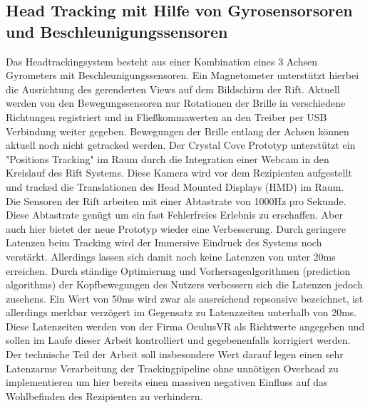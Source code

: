 \documentclass[pagesize, paper=a4, fontsize=12pt,titlepage=true, headings=small, headnosepline, abstractoff, liststotoc, nochapterprefix, plainheadsepline]{scrreprt}
\begin{document}
\subsection{Head Tracking mit Hilfe von Gyrosensorsoren  und Beschleunigungssensoren}
Das Headtrackingsystem besteht aus einer Kombination eines 3 Achsen Gyrometers mit Beschleunigungssensoren. Ein Magnetometer unterstützt hierbei die Ausrichtung des gerenderten Views auf dem Bildschirm der Rift. Aktuell werden von den Bewegungssensoren nur Rotationen der Brille in verschiedene Richtungen registriert und in Fließkommawerten an den Treiber per USB Verbindung weiter gegeben. Bewegungen der Brille entlang der Achsen können aktuell noch nicht getracked werden. Der Crystal Cove Prototyp unterstützt ein "Positions Tracking" im Raum durch die Integration einer Webcam in den Kreislauf des Rift Systems. Diese Kamera wird vor dem Rezipienten aufgestellt und tracked die Translationen des Head Mounted Displays (HMD) im Raum.
\\

Die Sensoren der Rift arbeiten mit einer Abtastrate von 1000Hz pro Sekunde. Diese Abtastrate genügt um ein fast Fehlerfreies Erlebnis zu erschaffen. Aber auch hier bietet der neue Prototyp wieder eine Verbesserung. Durch geringere Latenzen beim Tracking wird der Immersive Eindruck des Systems noch verstärkt. Allerdings lassen sich damit noch keine Latenzen von unter 20ms erreichen. Durch ständige Optimierung und Vorhersagealgorithmen (prediction algorithms) der Kopfbewegungen des Nutzers verbessern sich die Latenzen jedoch zusehens. Ein Wert von 50ms wird zwar als ausreichend repsonsive bezeichnet, ist allerdings merkbar verzögert im Gegensatz zu  Latenzzeiten unterhalb von 20ms. Diese Latenzeiten werden von der Firma OculusVR als Richtwerte angegeben und sollen im Laufe dieser Arbeit kontrolliert und gegebenenfalls korrigiert werden. Der technische Teil der Arbeit soll insbesondere Wert darauf legen einen sehr Latenzarme Verarbeitung der Trackingpipeline ohne unnötigen Overhead zu implementieren um hier bereits einen massiven negativen Einfluss auf das Wohlbefinden des Rezipienten zu verhindern.
\end{document}
